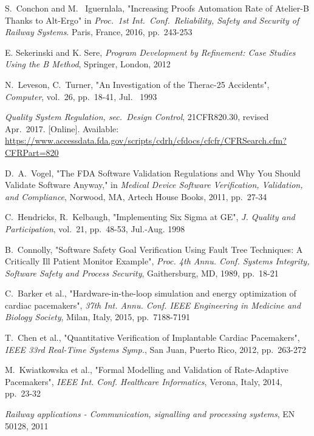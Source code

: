 \documentclass[11pt,journal]{IEEEtran}
\begin{document}
	\begin{thebibliography}{2}
		S.~Conchon and M.~ Iguernlala, "Increasing Proofs Automation Rate of Atelier-B Thanks to Alt-Ergo" in \emph{Proc.~1st Int.~Conf.~Reliability, Safety and Security of Railway Systems}. Paris, France, 2016, pp.~243-253
		
		E. Sekerinski and K. Sere, \emph{Program Development by Refinement: Case Studies Using the B Method}, Springer, London, 2012
		
		N.~Leveson, C.~Turner, "An Investigation of the Therac-25 Accidents", \emph{Computer}, vol.~26, pp.~18-41, Jul.~ 1993
		
		\emph{Quality System Regulation, sec.~Design Control}, 21CFR820.30, revised Apr.~2017. [Online]. Available:
		\url{https://www.accessdata.fda.gov/scripts/cdrh/cfdocs/cfcfr/CFRSearch.cfm?CFRPart=820}
		
		D.~A.~Vogel, "The FDA Software Validation Regulations and Why You Should Validate Software Anyway," in \emph{Medical Device Software Verification, Validation, and Compliance}, Norwood, MA, Artech House Books, 2011, pp.~27-34
		
		C.~Hendricks, R.~Kelbaugh, "Implementing Six Sigma at GE", \emph{J. Quality and Participation}, vol.~21, pp.~48-53, Jul.-Aug. 1998
		
		B.~Connolly, "Software Safety Goal Verification Using Fault Tree Techniques: A Critically Ill Patient Monitor Example", \emph{Proc. 4th Annu. Conf. Systems Integrity, Software Safety and Process Security}, Gaithersburg, MD, 1989, pp.~18-21
		
		C.~Barker et al., "Hardware-in-the-loop simulation and energy optimization of cardiac	pacemakers", \emph{37th Int. Annu. Conf. IEEE Engineering in Medicine and Biology Society}, Milan, Italy, 2015, pp.~7188-7191
		
		T.~Chen et al., "Quantitative Verification of Implantable Cardiac Pacemakers", \emph{IEEE 33rd Real-Time Systems Symp.}, San Juan, Puerto Rico, 2012, pp.~263-272
		
		M.~Kwiatkowska et al., "Formal Modelling and Validation of Rate-Adaptive Pacemakers", \emph{IEEE Int. Conf. Healthcare Informatics}, Verona, Italy, 2014, pp.~23-32
		
		\emph{Railway applications - Communication, signalling and processing systems}, EN 50128, 2011
		

\end{thebibliography}
\end{document}
